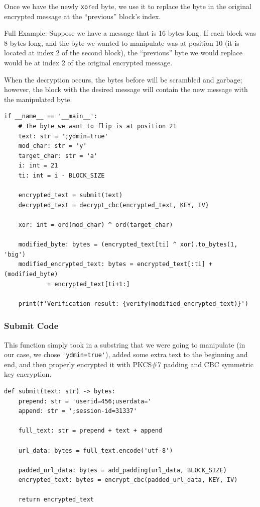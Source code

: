 \documentclass[11pt]{article}
\begin{document}
Once we have the newly \verb|xor|ed byte, we use it to replace the byte in the original encrypted message at the ``previous'' block's index.

Full Example: Suppose we have a message that is 16 bytes long. If each block was 8 bytes long, and the byte we wanted to manipulate was at position 10 (it is located at index 2 of the second block), the ``previous'' byte we would replace would be at index 2 of the original encrypted message.

When the decryption occurs, the bytes before will be scrambled and garbage; however, the block with the desired message will contain the new message with the manipulated byte.

\begin{framed}
\begin{verbatim}
if __name__ == '__main__':
    # The byte we want to flip is at position 21
    text: str = ';ydmin=true'
    mod_char: str = 'y'
    target_char: str = 'a'
    i: int = 21
    ti: int = i - BLOCK_SIZE

    encrypted_text = submit(text)
    decrypted_text = decrypt_cbc(encrypted_text, KEY, IV)

    xor: int = ord(mod_char) ^ ord(target_char)

    modified_byte: bytes = (encrypted_text[ti] ^ xor).to_bytes(1, 'big')
    modified_encrypted_text: bytes = encrypted_text[:ti] + (modified_byte) 
			+ encrypted_text[ti+1:]

    print(f'Verification result: {verify(modified_encrypted_text)}')
\end{verbatim}
\end{framed}

\subsubsection*{Submit Code}

This function simply took in a substring that we were going to manipulate (in our case, we chose \verb|'ydmin=true'|), added some extra text to the beginning and end, and then properly encrypted it with PKCS\#7 padding and CBC symmetric key encryption.

\begin{framed}
\begin{verbatim}
def submit(text: str) -> bytes:
    prepend: str = 'userid=456;userdata='
    append: str = ';session-id=31337'

    full_text: str = prepend + text + append 
    
    url_data: bytes = full_text.encode('utf-8')

    padded_url_data: bytes = add_padding(url_data, BLOCK_SIZE)
    encrypted_text: bytes = encrypt_cbc(padded_url_data, KEY, IV)

    return encrypted_text
\end{verbatim}
\end{framed}
\end{document}
